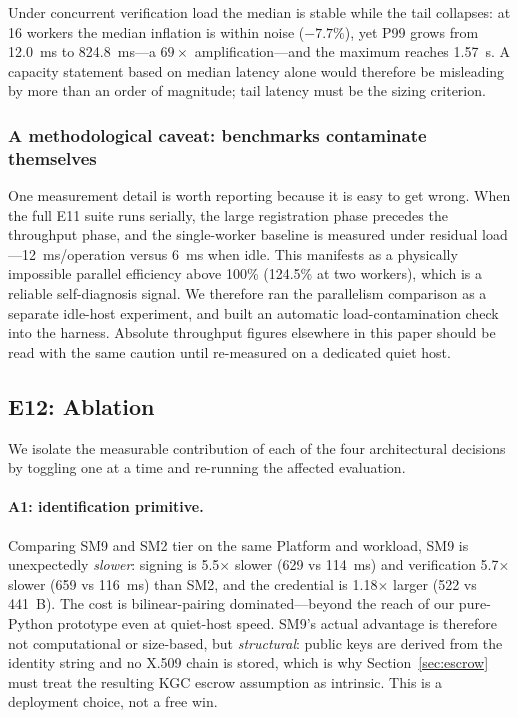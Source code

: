 \documentclass[10pt,twocolumn]{IEEEtran}
\begin{document}
Under concurrent verification load the median is stable while the tail
collapses: at 16 workers the median inflation is within noise
($-7.7\%$), yet P99 grows from 12.0~ms to 824.8~ms---a $69\times$
amplification---and the maximum reaches 1.57~s. A capacity statement based
on median latency alone would therefore be misleading by more than an
order of magnitude; tail latency must be the sizing criterion.

\subsubsection*{A methodological caveat: benchmarks contaminate themselves}

One measurement detail is worth reporting because it is easy to get
wrong. When the full E11 suite runs serially, the large registration phase
precedes the throughput phase, and the single-worker baseline is measured
under residual load---12~ms/operation versus 6~ms when idle. This
manifests as a physically impossible parallel efficiency above 100\%
(124.5\% at two workers), which is a reliable self-diagnosis signal. We
therefore ran the parallelism comparison as a separate idle-host
experiment, and built an automatic load-contamination check into the
harness. Absolute throughput figures elsewhere in this paper should be
read with the same caution until re-measured on a dedicated quiet host.

\subsection{E12: Ablation}

We isolate the measurable contribution of each of the four architectural
decisions by toggling one at a time and re-running the affected
evaluation.

\paragraph{A1: identification primitive.} Comparing SM9 and SM2 tier
on the same Platform and workload, SM9 is unexpectedly \emph{slower}:
signing is 5.5$\times$ slower (629 vs 114~ms) and verification
5.7$\times$ slower (659 vs 116~ms) than SM2, and the credential is
1.18$\times$ larger (522 vs 441~B). The cost is bilinear-pairing
dominated---beyond the reach of our pure-Python prototype even at
quiet-host speed. SM9's actual advantage is therefore not computational
or size-based, but \emph{structural}: public keys are derived from the
identity string and no X.509 chain is stored, which is why
Section~\ref{sec:escrow} must treat the resulting KGC escrow
assumption as intrinsic. This is a deployment choice, not a free win.
\end{document}
